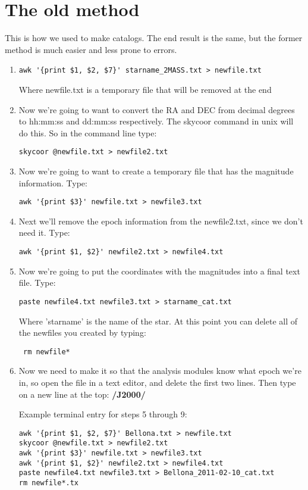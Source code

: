 \documentclass[10pt,preprint]{aastex}
\begin{document}
\newpage

\section{The old method}
This is how we used to make catalogs. The end result is the same, but the former method is much easier and less prone to errors.


\begin{enumerate}
\item
\begin{verbatim}
awk '{print $1, $2, $7}' starname_2MASS.txt > newfile.txt
\end{verbatim}
 Where newfile.txt is a temporary file that will be removed at the end
\item Now we're going to want to convert the RA and DEC from decimal degrees to hh:mm:ss and dd:mm:ss respectively. The skycoor command in unix will do this. So in the command line type: 
\begin{verbatim}
skycoor @newfile.txt > newfile2.txt
\end{verbatim}
\item Now we're going to want to create a temporary file that has the magnitude information. Type: 
\begin{verbatim}
awk '{print $3}' newfile.txt > newfile3.txt
\end{verbatim}
\item Next we'll remove the epoch information from the newfile2.txt, since we don't need it. Type: 
\begin{verbatim}
awk '{print $1, $2}' newfile2.txt > newfile4.txt
\end{verbatim}
\item Now we're going to put the coordinates with the magnitudes into a final text file. Type: 
\begin{verbatim}
paste newfile4.txt newfile3.txt > starname_cat.txt
\end{verbatim}
Where 'starname' is the name of the star. At this point you can delete all of the newfiles you created by typing:
\begin{verbatim}
 rm newfile* 
\end{verbatim}
\item Now we need to make it so that the analysis modules know what epoch we're in, so open the file in a text editor, and delete the first two lines. Then type on a new line at the top: \textbf{/J2000/}

\noindent Example terminal entry for steps 5 through 9:
\begin{verbatim}
awk '{print $1, $2, $7}' Bellona.txt > newfile.txt
skycoor @newfile.txt > newfile2.txt
awk '{print $3}' newfile.txt > newfile3.txt
awk '{print $1, $2}' newfile2.txt > newfile4.txt
paste newfile4.txt newfile3.txt > Bellona_2011-02-10_cat.txt
rm newfile*.tx
\end{verbatim}

\end{enumerate}
\end{document}

